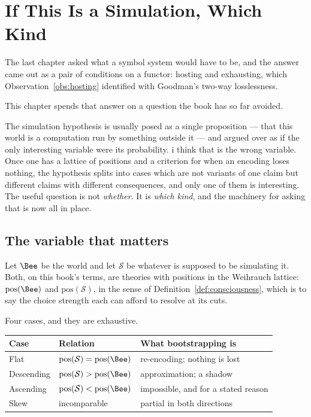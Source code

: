 \chapter{If This Is a Simulation, Which Kind}
\label{ch:sim}

The last chapter asked what a symbol system would have to be, and the
answer came out as a pair of conditions on a functor: hosting and
exhausting, which Observation~\ref{obs:hosting} identified with Goodman's
two-way losslessness.

This chapter spends that answer on a question the book has so far avoided.

The simulation hypothesis is usually posed as a single proposition ---
that this world is a computation run by something outside it --- and
argued over as if the only interesting variable were its probability.
i think that is the wrong variable.
Once one has a lattice of positions and a criterion for when an encoding
loses nothing, the hypothesis splits into cases which are not variants of
one claim but different claims with different consequences, and only one
of them is interesting.
The useful question is not \emph{whether}.
It is \emph{which kind}, and the machinery for asking that is now all in
place.

\section{The variable that matters}

Let $\Bee$ be the world and let $\mathcal{S}$ be whatever is supposed to
be simulating it.
Both, on this book's terms, are theories with positions in the Weihrauch
lattice: $\mathrm{pos}(\Bee)$ and $\mathrm{pos}(\mathcal{S})$, in the
sense of Definition~\ref{def:consciousness}, which is to say the choice
strength each can afford to resolve at its cuts.

Four cases, and they are exhaustive.

\begin{center}
\renewcommand{\arraystretch}{1.4}
\small
\begin{tabular}{lll}
\toprule
\textbf{Case} & \textbf{Relation} & \textbf{What bootstrapping is} \\
\midrule
Flat & $\mathrm{pos}(\mathcal{S}) = \mathrm{pos}(\Bee)$
     & re-encoding; nothing is lost \\
Descending & $\mathrm{pos}(\mathcal{S}) > \mathrm{pos}(\Bee)$
     & approximation; a shadow \\
Ascending & $\mathrm{pos}(\mathcal{S}) < \mathrm{pos}(\Bee)$
     & impossible, and for a stated reason \\
Skew & incomparable
     & partial in both directions \\
\bottomrule
\end{tabular}
\end{center}

